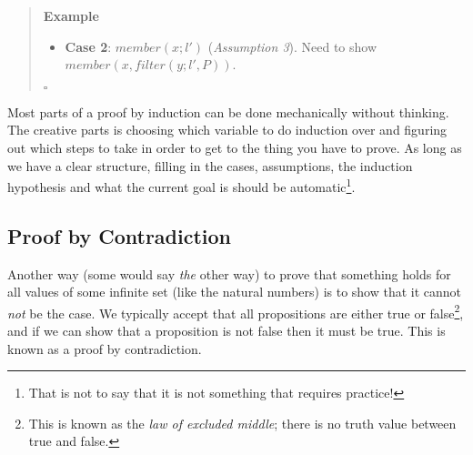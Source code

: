 \documentclass{tufte-handout}
\newcounter{example}
\newenvironment{example}
{\refstepcounter{example}\begin{quote}
\textbf{Example \arabic{example}}}
{

$\square$\end{quote}}
\begin{document}
\begin{example}
\begin{itemize}
\begin{itemize}
      \item \textbf{Case 2}: $\mathit{member}(x; l')$
        (\textit{Assumption 3}). Need to show
        $\mathit{member}(x, \mathit{filter}(y; l', P))$.
      \end{itemize}
  \end{itemize}
\end{example}

Most parts of a proof by induction can be done mechanically
without thinking. The creative parts is choosing which variable to
do induction over and figuring out which steps to take in order to
get to the thing you have to prove. As long as we have a clear
structure, filling in the cases, assumptions, the induction
hypothesis and what the current goal is should be
automatic\footnote{That is not to say that it is not something
  that requires practice! }.


\subsection{Proof by Contradiction}

Another way (some would say \emph{the} other way) to prove that
something holds for all values of some infinite set (like the
natural numbers) is to show that it cannot \emph{not} be the case.
We typically accept that all propositions are either true or
false\footnote{This is known as the \emph{law of excluded middle};
  there is no truth value between true and false. }, and if we can
show that a proposition is not false then it must be true. This is
known as a proof by contradiction.
\end{document}
